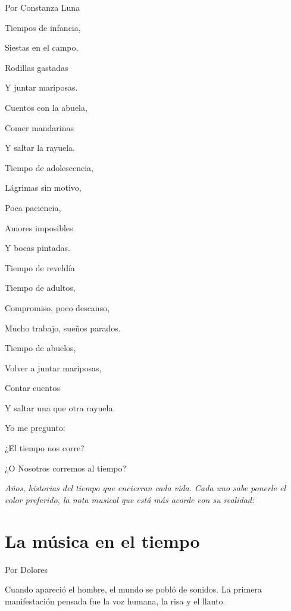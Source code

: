 \documentclass[11pt,twoside,openright,a5paper]{book}
\begin{document}
                                                                                              \begin{flushright}Por Constanza Luna\end{flushright}
\begin{center}
Tiempos de infancia,

Siestas en el campo,

Rodillas gastadas

Y juntar mariposas.

Cuentos con la abuela,

Comer mandarinas

Y saltar la rayuela.

Tiempo de adolescencia,

Lágrimas sin motivo,

Poca paciencia,

Amores imposibles

Y bocas pintadas.

Tiempo de reveldía

Tiempo de adultos,

Compromiso, poco descanso,

Mucho trabajo, sueños parados.

Tiempo de abuelos,

Volver a juntar mariposas,

Contar cuentos

Y saltar una que otra rayuela.

Yo me pregunto:

¿El tiempo nos corre?

¿O Nosotros corremos al tiempo? 
\end{center}

\vspace{0.5cm}
\emph{Años, historias del tiempo que encierran cada vida. Cada uno sabe ponerle el color preferido, la nota musical que está más acorde con su realidad:}

\section*{La música en el tiempo}

\begin{flushright}Por Dolores\end{flushright}

Cuando apareció el hombre, el mundo se pobló de sonidos. La primera manifestación pensada fue la voz humana, la risa y el llanto.
\end{document}
